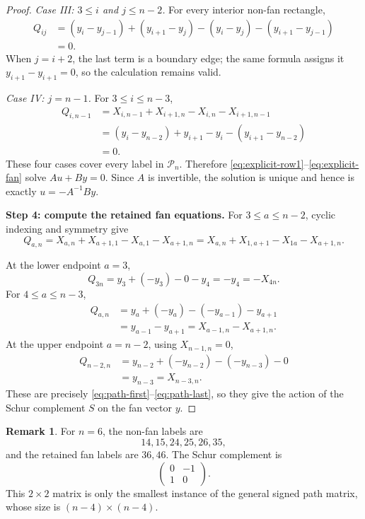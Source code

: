 \documentclass[11pt]{article}
\theoremstyle{definition}
\newtheorem*{innerremark}{Remark}
\begin{document}
\begin{proof}
\smallskip
\emph{Case III: $3\leq i$ and $j\leq n-2$.}
For every interior non-fan rectangle,
\begin{align*}
 Q_{ij}
 &=(y_i-y_{j-1})+(y_{i+1}-y_j)
   -(y_i-y_j)-(y_{i+1}-y_{j-1})\\
 &=0.
\end{align*}
When $j=i+2$, the last term is a boundary edge; the same formula assigns it
$y_{i+1}-y_{i+1}=0$, so the calculation remains valid.

\smallskip
\emph{Case IV: $j=n-1$.}
For $3\leq i\leq n-3$,
\begin{align*}
 Q_{i,n-1}
 &=X_{i,n-1}+X_{i+1,n}-X_{i,n}-X_{i+1,n-1}\\
 &=(y_i-y_{n-2})+y_{i+1}-y_i-(y_{i+1}-y_{n-2})\\
 &=0.
\end{align*}
These four cases cover every label in $\mathcal P_n$.  Therefore
\eqref{eq:explicit-row1}--\eqref{eq:explicit-fan} solve $Au+By=0$.  Since
$A$ is invertible, the solution is unique and hence is exactly
$u=-A^{-1}By$.

\medskip
\noindent\textbf{Step 4: compute the retained fan equations.}
For $3\leq a\leq n-2$, cyclic indexing and symmetry give
\begin{equation}\label{eq:fan-general}
 Q_{a,n}
 =X_{a,n}+X_{a+1,1}-X_{a,1}-X_{a+1,n}
 =X_{a,n}+X_{1,a+1}-X_{1a}-X_{a+1,n}.
\end{equation}

At the lower endpoint $a=3$,
\[
 Q_{3n}=y_3+(-y_3)-0-y_4=-y_4=-X_{4n}.
\]
For $4\leq a\leq n-3$,
\begin{align*}
 Q_{a,n}
 &=y_a+(-y_a)-(-y_{a-1})-y_{a+1}\\
 &=y_{a-1}-y_{a+1}
  =X_{a-1,n}-X_{a+1,n}.
\end{align*}
At the upper endpoint $a=n-2$, using $X_{n-1,n}=0$,
\begin{align*}
 Q_{n-2,n}
 &=y_{n-2}+(-y_{n-2})-(-y_{n-3})-0\\
 &=y_{n-3}=X_{n-3,n}.
\end{align*}
These are precisely \eqref{eq:path-first}--\eqref{eq:path-last}, so they give
the action of the Schur complement $S$ on the fan vector $y$.
\end{proof}

\begin{innerremark}
For $n=6$, the non-fan labels are
\[
14,15,24,25,26,35,
\]
and the retained fan labels are $36,46$.  The Schur complement is
\[
 \begin{pmatrix}0&-1\\1&0\end{pmatrix}.
\]
This $2\times2$ matrix is only the smallest instance of the general signed
path matrix, whose size is $(n-4)\times(n-4)$.
\end{innerremark}
\end{document}
